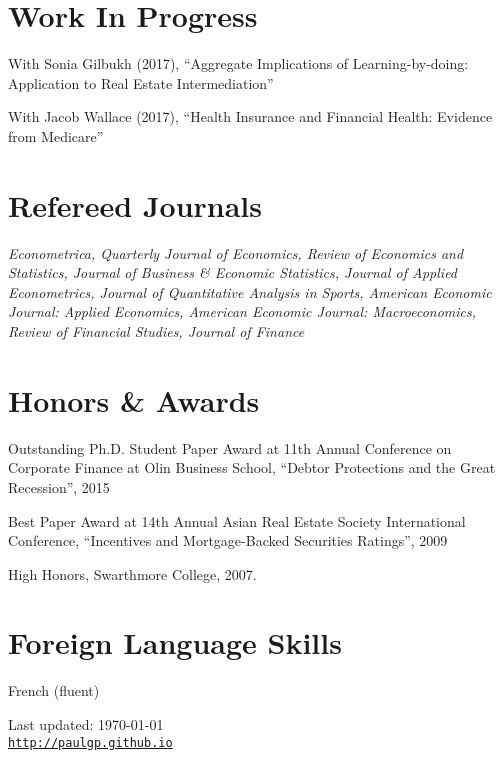 \documentclass[letterpaper]{article}
\renewenvironment{itemize}{
  \begin{list}{}
    { \setlength{\itemsep}{5pt}
      \setlength{\parsep}{0pt}
      \setlength{\topsep}{0pt}
      \setlength{\leftmargin}{0em} } }{
  \end{list}}
\begin{document}
\section*{Work In Progress}
\begin{itemize}
\item With Sonia Gilbukh (2017), ``Aggregate Implications of Learning-by-doing: Application to Real Estate Intermediation''
\item With Jacob Wallace (2017), ``Health Insurance and Financial Health: Evidence from Medicare''

\end{itemize}


\section*{Refereed Journals}
\textit{Econometrica, Quarterly Journal of Economics, Review of Economics and Statistics, Journal of Business \& Economic Statistics, Journal of Applied Econometrics, Journal of Quantitative Analysis in Sports, American Economic Journal: Applied Economics, American Economic Journal: Macroeconomics, Review of Financial Studies, Journal of Finance}


\section*{Honors \& Awards}

\begin{itemize}
\item Outstanding Ph.D. Student Paper Award at 11th Annual Conference
  on Corporate Finance at Olin Business School, ``Debtor Protections
  and the Great Recession'', 2015
\item Best Paper Award at 14th Annual Asian Real Estate Society
  International Conference, ``Incentives and Mortgage-Backed
  Securities Ratings'', 2009
\item High Honors, Swarthmore College, 2007.
\end{itemize}

\section*{Foreign Language Skills}

\begin{itemize}
\item French (fluent)
\end{itemize}
\bigskip

\begin{center}
\begin{footnotesize}
Last updated: \today \\
\href{http://paulgp.github.io}{\tt http://paulgp.github.io}
\end{footnotesize}
\end{center}
\end{document}
